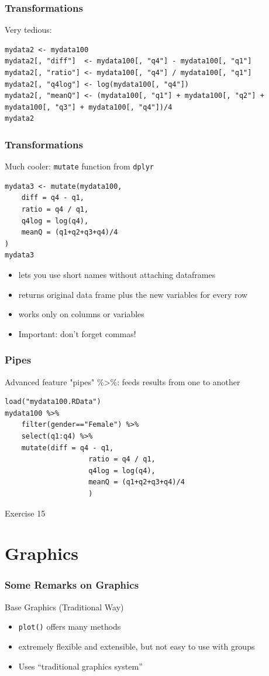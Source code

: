\documentclass[xcolor={svgnames},10pt,
handout
]{beamer}
\begin{document}
\begin{frame}[fragile]\frametitle{Transformations}
Very tedious:
\begin{lstlisting}
mydata2 <- mydata100
mydata2[, "diff"]  <- mydata100[, "q4"] - mydata100[, "q1"]
mydata2[, "ratio"] <- mydata100[, "q4"] / mydata100[, "q1"]
mydata2[, "q4log"] <- log(mydata100[, "q4"])
mydata2[, "meanQ"] <- (mydata100[, "q1"] + mydata100[, "q2"] + mydata100[, "q3"] + mydata100[, "q4"])/4
mydata2
\end{lstlisting}
\end{frame}

\begin{frame}[fragile]\frametitle{Transformations}
Much cooler: \lstinline|mutate| function from \lstinline|dplyr|
\begin{lstlisting}
mydata3 <- mutate(mydata100,
	diff = q4 - q1,
	ratio = q4 / q1,
	q4log = log(q4),
	meanQ = (q1+q2+q3+q4)/4
)
mydata3
\end{lstlisting}
\begin{itemize}
\item lets you use short names without attaching dataframes
\item returns original data frame plus the new variables for every row
\item works only on columns or variables
\item Important: don't forget commas!
\end{itemize}
\end{frame}

\begin{frame}[fragile]\frametitle{Pipes}
Advanced feature "pipes" \%>\%: feeds results from one to another
\begin{lstlisting}
load("mydata100.RData")
mydata100 %>% 
	filter(gender=="Female") %>%
	select(q1:q4) %>%
	mutate(diff = q4 - q1, 
					ratio = q4 / q1,
					q4log = log(q4),
					meanQ = (q1+q2+q3+q4)/4
					)
\end{lstlisting}
\end{frame}

\begin{frame}[standout]
Exercise 15
\end{frame}


\section{Graphics}

\begin{frame}[fragile]\frametitle{Some Remarks on Graphics}
Base Graphics (Traditional Way)
\begin{itemize}
\item \lstinline|plot()| offers many methods
\item extremely flexible and extensible, but not easy to use with groups
\item Uses \enquote{traditional graphics system}
\end{itemize}
\end{frame}
\end{document}
